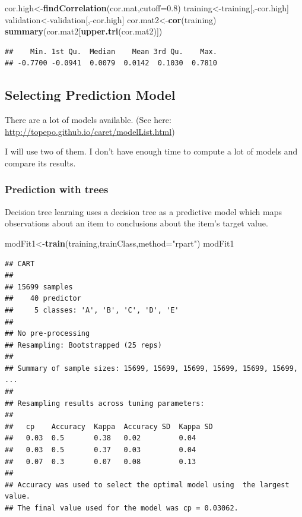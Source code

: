 \documentclass[]{article}
\newenvironment{Shaded}{\begin{snugshade}}{\end{snugshade}}
\newcommand{\KeywordTok}[1]{\textcolor[rgb]{0.13,0.29,0.53}{\textbf{{#1}}}}
\newcommand{\DataTypeTok}[1]{\textcolor[rgb]{0.13,0.29,0.53}{{#1}}}
\newcommand{\FloatTok}[1]{\textcolor[rgb]{0.00,0.00,0.81}{{#1}}}
\newcommand{\StringTok}[1]{\textcolor[rgb]{0.31,0.60,0.02}{{#1}}}
\newcommand{\NormalTok}[1]{{#1}}
\begin{document}
\begin{Shaded}
\begin{Highlighting}[]
\NormalTok{cor.high<-}\KeywordTok{findCorrelation}\NormalTok{(cor.mat,}\DataTypeTok{cutoff=}\FloatTok{0.8}\NormalTok{)}
\NormalTok{training<-training[,-cor.high]}
\NormalTok{validation<-validation[,-cor.high]}
\NormalTok{cor.mat2<-}\KeywordTok{cor}\NormalTok{(training)}
\KeywordTok{summary}\NormalTok{(cor.mat2[}\KeywordTok{upper.tri}\NormalTok{(cor.mat2)])}
\end{Highlighting}
\end{Shaded}

\begin{verbatim}
##    Min. 1st Qu.  Median    Mean 3rd Qu.    Max. 
## -0.7700 -0.0941  0.0079  0.0142  0.1030  0.7810
\end{verbatim}

\subsection{Selecting Prediction
Model}\label{selecting-prediction-model}

There are a lot of models available. (See here:
\url{http://topepo.github.io/caret/modelList.html})

I will use two of them. I don't have enough time to compute a lot of
models and compare its results.

\subsubsection{Prediction with trees}\label{prediction-with-trees}

Decision tree learning uses a decision tree as a predictive model which
maps observations about an item to conclusions about the item's target
value.

\begin{Shaded}
\begin{Highlighting}[]
\NormalTok{modFit1<-}\KeywordTok{train}\NormalTok{(training,trainClass,}\DataTypeTok{method=}\StringTok{"rpart"}\NormalTok{)}
\NormalTok{modFit1}
\end{Highlighting}
\end{Shaded}

\begin{verbatim}
## CART 
## 
## 15699 samples
##    40 predictor
##     5 classes: 'A', 'B', 'C', 'D', 'E' 
## 
## No pre-processing
## Resampling: Bootstrapped (25 reps) 
## 
## Summary of sample sizes: 15699, 15699, 15699, 15699, 15699, 15699, ... 
## 
## Resampling results across tuning parameters:
## 
##   cp    Accuracy  Kappa  Accuracy SD  Kappa SD
##   0.03  0.5       0.38   0.02         0.04    
##   0.03  0.5       0.37   0.03         0.04    
##   0.07  0.3       0.07   0.08         0.13    
## 
## Accuracy was used to select the optimal model using  the largest value.
## The final value used for the model was cp = 0.03062.
\end{verbatim}
\end{document}
